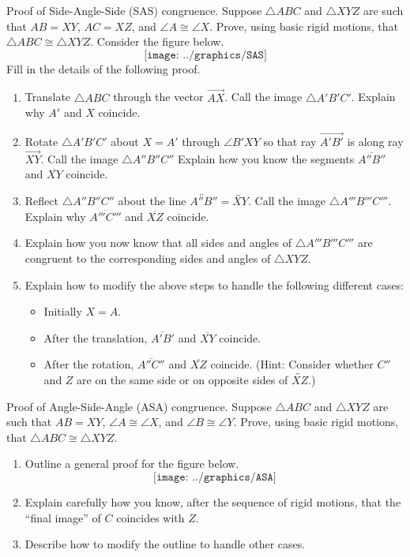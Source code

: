\begin{prob}
Proof of Side-Angle-Side (SAS) congruence.  Suppose $\triangle ABC$ and $\triangle XYZ$ are such that $AB=XY$, $AC=XZ$, and $\angle A \cong \angle X$.  Prove, using basic rigid motions, that $\triangle ABC \cong \triangle XYZ$.  Consider the figure below.  
$$\texttt{[image: ../graphics/SAS]}$$
Fill in the details of the following proof.  
\begin{enumerate}
\item Translate $\triangle ABC$ through the vector $\overrightarrow{AX}$.  Call the image $\triangle A'B'C'$.  Explain why $A'$ and $X$ coincide.
\item Rotate $\triangle A'B'C'$ about $X=A'$ through $\angle B'XY$ so that ray $\overrightarrow{A'B'}$ is along ray $\overrightarrow{XY}$.  Call the image $\triangle A''B''C''$   Explain how you know the segments $\overline{A''B''}$ and $\overline{XY}$ coincide. 
\item Reflect $\triangle A''B''C''$ about the line $\overleftrightarrow{A''B''} = \overleftrightarrow{XY}$.  Call the image $\triangle A'''B'''C'''$.  Explain why $\overline{A'''C'''}$ and $\overline{XZ}$ coincide.
\item Explain how you now know that all sides and angles of $\triangle A'''B'''C'''$ are congruent to the corresponding sides and angles of $\triangle XYZ$.  
\item Explain how to modify the above steps to handle the following different cases: 
\begin{itemize}
\item Initially $X = A$. 
\item After the translation, $\overline{A'B'}$ and $\overline{XY}$ coincide. 
\item After the rotation, $\overline{A''C''}$ and $\overline{XZ}$ coincide.  (Hint:  Consider whether $C''$ and $Z$ are on the same side or on opposite sides of $\overleftrightarrow{XZ}$.)  
\end{itemize}
\end{enumerate}
\end{prob}

\begin{prob}
Proof of Angle-Side-Angle (ASA) congruence.  Suppose $\triangle ABC$ and $\triangle XYZ$ are such that $AB=XY$, $\angle A \cong \angle X$, and $\angle B \cong \angle Y$.  Prove, using basic rigid motions, that $\triangle ABC \cong \triangle XYZ$.  
\begin{enumerate}
\item Outline a general proof for the figure below.  
$$\texttt{[image: ../graphics/ASA]}$$
\item Explain carefully how you know, after the sequence of rigid motions, that the ``final image'' of $C$ coincides with $Z$.  
\item Describe how to modify the outline to handle other cases. 
\end{enumerate}
\end{prob}

